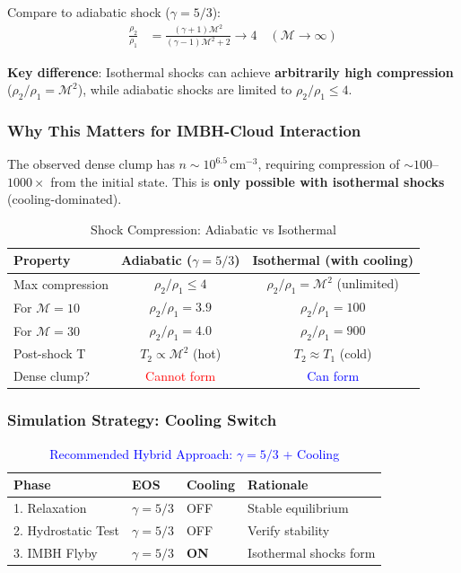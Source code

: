 \documentclass[11pt,a4paper]{article}
\newcommand{\cmcubed}{\,\mathrm{cm^{-3}}}
\begin{document}
Compare to adiabatic shock ($\gamma = 5/3$):
\begin{align}
    \frac{\rho_2}{\rho_1} &= \frac{(\gamma+1)\mathcal{M}^2}{(\gamma-1)\mathcal{M}^2 + 2} \to 4 \quad (\mathcal{M} \to \infty)
\end{align}

\textbf{Key difference}: Isothermal shocks can achieve \textbf{arbitrarily high compression}
($\rho_2/\rho_1 = \mathcal{M}^2$), while adiabatic shocks are limited to $\rho_2/\rho_1 \leq 4$.

\subsubsection{Why This Matters for IMBH-Cloud Interaction}

The observed dense clump has $n \sim 10^{6.5}\cmcubed$, requiring compression of
$\sim 100$--$1000\times$ from the initial state. This is \textbf{only possible with
isothermal shocks} (cooling-dominated).

\begin{table}[h]
\centering
\caption{Shock Compression: Adiabatic vs Isothermal}
\begin{tabular}{lcc}
\toprule
\textbf{Property} & \textbf{Adiabatic ($\gamma = 5/3$)} & \textbf{Isothermal (with cooling)} \\
\midrule
Max compression & $\rho_2/\rho_1 \leq 4$ & $\rho_2/\rho_1 = \mathcal{M}^2$ (unlimited) \\
For $\mathcal{M} = 10$ & $\rho_2/\rho_1 = 3.9$ & $\rho_2/\rho_1 = 100$ \\
For $\mathcal{M} = 30$ & $\rho_2/\rho_1 = 4.0$ & $\rho_2/\rho_1 = 900$ \\
Post-shock T & $T_2 \propto \mathcal{M}^2$ (hot) & $T_2 \approx T_1$ (cold) \\
Dense clump? & \textcolor{red}{Cannot form} & \textcolor{blue}{Can form} \\
\bottomrule
\end{tabular}
\end{table}

\subsubsection{Simulation Strategy: Cooling Switch}

\begin{table}[h]
\centering
\caption{\textcolor{blue}{Recommended Hybrid Approach: $\gamma = 5/3$ + Cooling}}
\begin{tabular}{llll}
\toprule
\textbf{Phase} & \textbf{EOS} & \textbf{Cooling} & \textbf{Rationale} \\
\midrule
1. Relaxation & $\gamma = 5/3$ & OFF & Stable equilibrium \\
2. Hydrostatic Test & $\gamma = 5/3$ & OFF & Verify stability \\
3. IMBH Flyby & $\gamma = 5/3$ & \textbf{ON} & Isothermal shocks form \\
\bottomrule
\end{tabular}
\end{table}
\end{document}

